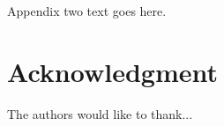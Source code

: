 \documentclass[journal]{IEEEtran}
\begin{document}
\section{}
Appendix two text goes here.


\section*{Acknowledgment}


The authors would like to thank...


\ifCLASSOPTIONcaptionsoff
  \newpage
\fi




\end{document}
